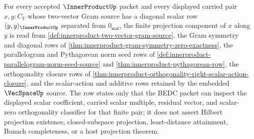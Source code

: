 \begin{theorem}
\label{thm:innerproduct-finite-orthogonal-projection-derivation}
For every accepted $\InnerProductUp$ packet and every displayed carried pair
$x,y:C_V$ whose two-vector Gram source has a diagonal scalar row
$\langle y,y\rangle_{\InnerProductUp}$ separated from
$0_{\mathsf{scal}}$, the finite projection component of $x$ along $y$ is read
from
\autoref{def:innerproduct-two-vector-gram-source}, the Gram symmetry and
diagonal rows of \autoref{thm:innerproduct-gram-symmetry-zero-exactness}, the
parallelogram and Pythagorean norm seed rows of
\autoref{def:innerproduct-parallelogram-norm-seed-source} and
\autoref{thm:innerproduct-pythagorean-row}, the orthogonality closure rows of
\autoref{thm:innerproduct-orthogonality-right-scalar-action-closure}, and the
scalar-action and additive rows retained by the embedded $\VecSpaceUp$ source.
The row states only that the BEDC packet can inspect the displayed scalar
coefficient, carried scalar multiple, residual vector, and scalar-zero
orthogonality classifier for that finite pair; it does not assert Hilbert
projection existence, closed-subspace projection, least-distance attainment,
Banach completeness, or a host projection theorem.
\end{theorem}
